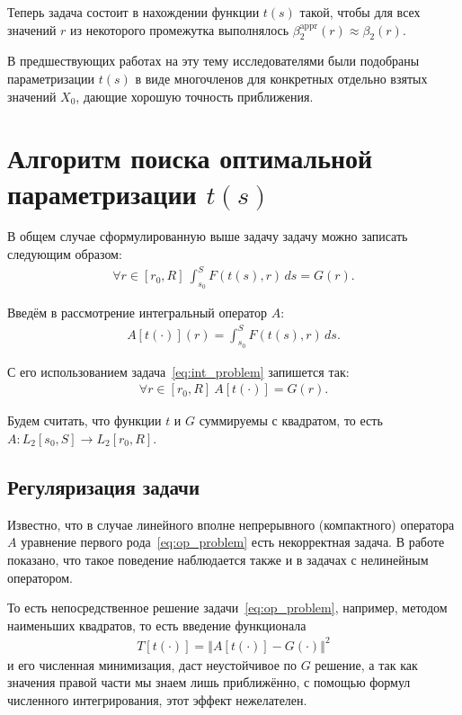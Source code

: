 \documentclass[a4paper,14pt]{extarticle}
\newcommand{\norm}[1]{\left\Vert #1 \right\Vert}
\begin{document}
    Теперь задача состоит в нахождении функции $t(s)$ такой, чтобы для всех значений $r$ из некоторого промежутка выполнялось $\beta^{\mathrm{appr}}_2(r) \approx \beta_2(r)$.

    В предшествующих работах на эту тему исследователями были подобраны параметризации $t(s)$ в виде многочленов для конкретных отдельно взятых значений $X_0$, дающие хорошую точность приближения.

    \newpage

    \section{Алгоритм поиска оптимальной параметризации $t(s)$}

    В общем случае сформулированную выше задачу задачу можно записать следующим образом:
    \begin{gather}
        \label{eq:int_problem}
        \forall r \in [r_0, R] \
        \int_{s_0}^{S} F(t(s), r) \, ds
        = G(r).
    \end{gather}

    Введём в рассмотрение интегральный оператор $A$:
    \begin{gather*}
        A[t(\cdot)](r) =
        \int_{s_0}^{S} F(t(s), r) \, ds.
    \end{gather*}

    С его использованием задача~\eqref{eq:int_problem} запишется так:
    \begin{gather}
        \label{eq:op_problem}
        \forall r \in [r_0, R] \ A[t(\cdot)] = G(r).
    \end{gather}

    Будем считать, что функции $t$ и $G$ суммируемы с квадратом, то есть $A:L_2[s_0, S] \to L_2[r_0, R]$.

    \subsection{Регуляризация задачи}

    Известно, что в случае линейного вполне непрерывного (компактного) оператора $A$ уравнение первого рода~\eqref{eq:op_problem} есть некорректная задача. В работе~\cite{bib:Jonca:1988} показано, что такое поведение наблюдается также и в задачах с нелинейным оператором.

    То есть непосредственное решение задачи~\eqref{eq:op_problem}, например, методом наименьших квадратов, то есть введение функционала
    \begin{gather}
        \label{eq:func_ill}
        T[t(\cdot)] = \norm{A[t(\cdot)] - G(\cdot)}^2
    \end{gather}
    и его численная минимизация, даст неустойчивое по $G$ решение, а так как значения правой части мы знаем лишь приближённо, с помощью формул численного интегрирования, этот эффект нежелателен.
\end{document}
